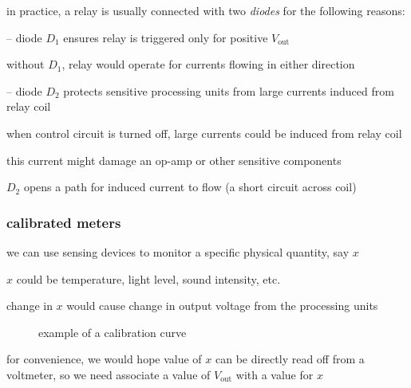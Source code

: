 \cmt in practice, a relay is usually connected with two \emph{diodes} for the following reasons:

\begin{compactitem}
	\item[--] diode $D_1$ ensures relay is triggered only for positive $V_\text{out}$
	
	without $D_1$, relay would operate for currents flowing in either direction
	
	\item[--] diode $D_2$ protects sensitive processing units from large currents induced from relay coil
	
	when control circuit is turned off, large currents could be induced from relay coil
	
	this current might damage an op-amp or other sensitive components
	
	$D_2$ opens a path for induced current to flow (a short circuit across coil)
\end{compactitem}





\subsubsection{calibrated meters}

we can use sensing devices to monitor a specific physical quantity, say $x$

$x$ could be temperature, light level, sound intensity, etc.

change in $x$ would cause change in output voltage from the processing units

\begin{wrapfigure}{r}{0.45\textwidth}
	\centering
	\vspace*{-5pt}
	\caption*{example of a calibration curve}
	\vspace*{-15pt}
\end{wrapfigure}

for convenience, we would hope value of $x$ can be directly read off from a voltmeter, so we need associate a value of $V_\text{out}$ with a value for $x$


